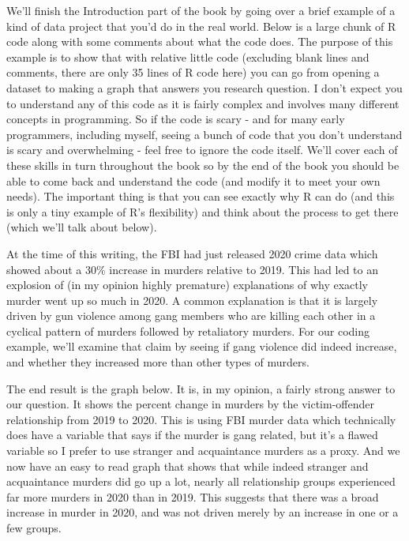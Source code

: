 \documentclass[
]{krantz}
\begin{document}
We'll finish the Introduction part of the book by going over a brief example of a kind of data project that you'd do in the real world. Below is a large chunk of R code along with some comments about what the code does. The purpose of this example is to show that with relative little code (excluding blank lines and comments, there are only 35 lines of R code here) you can go from opening a dataset to making a graph that answers you research question. I don't expect you to understand any of this code as it is fairly complex and involves many different concepts in programming. So if the code is scary - and for many early programmers, including myself, seeing a bunch of code that you don't understand is scary and overwhelming - feel free to ignore the code itself. We'll cover each of these skills in turn throughout the book so by the end of the book you should be able to come back and understand the code (and modify it to meet your own needs). The important thing is that you can see exactly why R can do (and this is only a tiny example of R's flexibility) and think about the process to get there (which we'll talk about below).

At the time of this writing, the FBI had just released 2020 crime data which showed about a 30\% increase in murders relative to 2019. This had led to an explosion of (in my opinion highly premature) explanations of why exactly murder went up so much in 2020. A common explanation is that it is largely driven by gun violence among gang members who are killing each other in a cyclical pattern of murders followed by retaliatory murders. For our coding example, we'll examine that claim by seeing if gang violence did indeed increase, and whether they increased more than other types of murders.

The end result is the graph below. It is, in my opinion, a fairly strong answer to our question. It shows the percent change in murders by the victim-offender relationship from 2019 to 2020. This is using FBI murder data which technically does have a variable that says if the murder is gang related, but it's a flawed variable so I prefer to use stranger and acquaintance murders as a proxy. And we now have an easy to read graph that shows that while indeed stranger and acquaintance murders did go up a lot, nearly all relationship groups experienced far more murders in 2020 than in 2019. This suggests that there was a broad increase in murder in 2020, and was not driven merely by an increase in one or a few groups.
\end{document}
